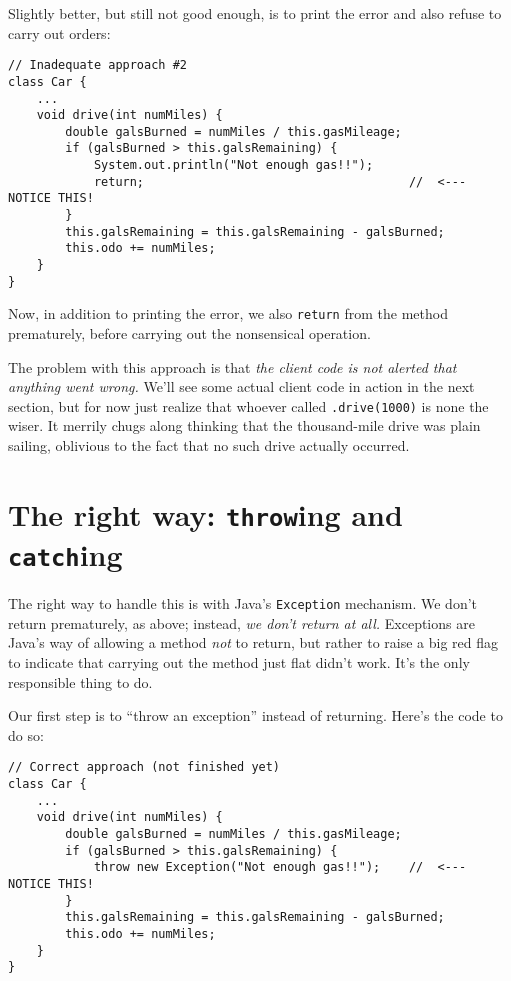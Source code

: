 Slightly better, but still not good enough, is to print the error and also
refuse to carry out orders:

\begin{Verbatim}[samepage=true,fontsize=\scriptsize,frame=single]
// Inadequate approach #2
class Car {
    ...
    void drive(int numMiles) {
        double galsBurned = numMiles / this.gasMileage;
        if (galsBurned > this.galsRemaining) {
            System.out.println("Not enough gas!!");
            return;                                     //  <---  NOTICE THIS!
        }
        this.galsRemaining = this.galsRemaining - galsBurned;
        this.odo += numMiles;
    }
}
\end{Verbatim}

Now, in addition to printing the error, we also \texttt{return} from the
method prematurely, before carrying out the nonsensical operation.

The problem with this approach is that \textit{the client code is not alerted
that anything went wrong.} We'll see some actual client code in action in the
next section, but for now just realize that whoever called
\texttt{.drive(1000)} is none the wiser. It merrily chugs along thinking that
the thousand-mile drive was plain sailing, oblivious to the fact that no such
drive actually occurred.

\section{The right way: \texttt{throw}ing and \texttt{catch}ing}

The right way to handle this is with Java's \texttt{Exception} mechanism. We
don't return prematurely, as above; instead, \textit{we don't return at all.}
Exceptions are Java's way of allowing a method \textit{not} to return, but
rather to raise a big red flag to indicate that carrying out the method just
flat didn't work. It's the only responsible thing to do.

Our first step is to ``throw an exception'' instead of returning. Here's the
code to do so:

\begin{Verbatim}[samepage=true,fontsize=\scriptsize,frame=single]
// Correct approach (not finished yet)
class Car {
    ...
    void drive(int numMiles) {
        double galsBurned = numMiles / this.gasMileage;
        if (galsBurned > this.galsRemaining) {
            throw new Exception("Not enough gas!!");    //  <---  NOTICE THIS!
        }
        this.galsRemaining = this.galsRemaining - galsBurned;
        this.odo += numMiles;
    }
}
\end{Verbatim}

